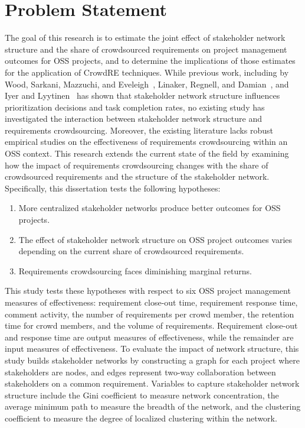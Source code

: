\section{Problem Statement}

The goal of this research is to estimate the joint effect of stakeholder network structure and the share of crowdsourced requirements on project management outcomes for OSS projects, and to determine the implications of those estimates for the application of CrowdRE techniques. While previous work, including by Wood, Sarkani, Mazzuchi, and Eveleigh~\cite{wood}, Linaker, Regnell, and Damian~\cite{linaker}, and Iyer and Lyytinen~\cite{iyer} has shown that stakeholder network structure influences prioritization decisions and task completion rates, no existing study has investigated the interaction between stakeholder network structure and requirements crowdsourcing. Moreover, the existing literature lacks robust empirical studies on the effectiveness of requirements crowdsourcing within an OSS context. This research extends the current state of the field by examining how the impact of requirements crowdsourcing changes with the share of crowdsourced requirements and the structure of the stakeholder network. Specifically, this dissertation tests the following hypotheses:

\begin{enumerate}
    \item More centralized stakeholder networks produce better outcomes for OSS projects.
    \item The effect of stakeholder network structure on OSS project outcomes varies depending on the current share of crowdsourced requirements.
    \item Requirements crowdsourcing faces diminishing marginal returns.
\end{enumerate}

This study tests these hypotheses with respect to six OSS project management measures of effectiveness: requirement close-out time, requirement response time, comment activity, the number of requirements per crowd member, the retention time for crowd members, and the volume of requirements. Requirement close-out and response time are output measures of effectiveness, while the remainder are input measures of effectiveness. To evaluate the impact of network structure, this study builds stakeholder networks by constructing a graph for each project where stakeholders are nodes, and edges represent two-way collaboration between stakeholders on a common requirement. Variables to capture stakeholder network structure include the Gini coefficient to measure network concentration, the average minimum path to measure the breadth of the network, and the clustering coefficient to measure the degree of localized clustering within the network.

